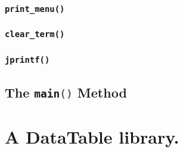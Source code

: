 \documentclass{article}
\newcommand{\code}[1]{\lstinline[language=C]!#1!}
\begin{document}
\subsubsection{\texttt{print\_menu()}}



\subsubsection{\texttt{clear\_term()}}



\subsubsection{\texttt{jprintf()}}



\newpage

\subsection{The \code{main()} Method}



\newpage

\section{A DataTable library.}
\end{document}
